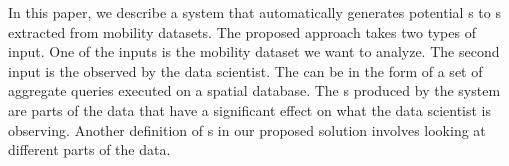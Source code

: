 



In this paper, we describe a system that automatically generates potential {\explanation}s to {\fact}s extracted from mobility datasets. The proposed approach takes two types of input. One of the inputs is the mobility dataset we want to analyze. The second input is the {\fact} observed by the data scientist. The {\fact} can be in the form of a set of aggregate queries executed on a spatial database. 
The {\explanation}s produced by the system are parts of the data that have a significant effect on what the {\fact} data scientist is observing. %
Another definition of {\explanation}s in our proposed solution involves looking at different parts of the data. 


